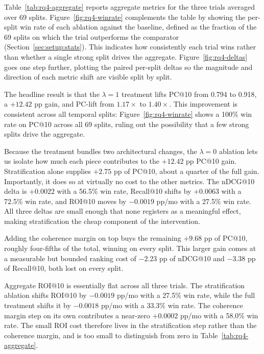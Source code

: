 Table~\ref{tab:rq4-aggregate} reports aggregate metrics for the three trials averaged over 69 splits. Figure~\ref{fig:rq4-winrate} complements the table by showing the per-split win rate of each ablation against the baseline, defined as the fraction of the 69 splits on which the trial outperforms the comparator (Section~\ref{sec:setup:stats}). This indicates how consistently each trial wins rather than whether a single strong split drives the aggregate. Figure~\ref{fig:rq4-deltas} goes one step further, plotting the paired per-split deltas so the magnitude and direction of each metric shift are visible split by split.

The headline result is that the $\lambda = 1$ treatment lifts PC@10 from 0.794 to 0.918, a $+12.42$ pp gain, and PC-lift from $1.17\times$ to $1.40\times$. This improvement is consistent across all temporal splits: Figure~\ref{fig:rq4-winrate} shows a 100\% win rate on PC@10 across all 69 splits, ruling out the possibility that a few strong splits drive the aggregate.

Because the treatment bundles two architectural changes, the $\lambda = 0$ ablation lets us isolate how much each piece contributes to the $+12.42$ pp PC@10 gain. Stratification alone supplies $+2.75$ pp of PC@10, about a quarter of the full gain. Importantly, it does so at virtually no cost to the other metrics. The nDCG@10 delta is $+0.0022$ with a 56.5\% win rate, Recall@10 shifts by $+0.0063$ with a 72.5\% win rate, and ROI@10 moves by $-0.0019$ pp/mo with a 27.5\% win rate. All three deltas are small enough that none registers as a meaningful effect, making stratification the cheap component of the intervention.

Adding the coherence margin on top buys the remaining $+9.68$ pp of PC@10, roughly four-fifths of the total, winning on every split. This larger gain comes at a measurable but bounded ranking cost of $-2.23$ pp of nDCG@10 and $-3.38$ pp of Recall@10, both lost on every split.

Aggregate ROI@10 is essentially flat across all three trials. The stratification ablation shifts ROI@10 by $-0.0019$ pp/mo with a 27.5\% win rate, while the full treatment shifts it by $-0.0018$ pp/mo with a 33.3\% win rate. The coherence margin step on its own contributes a near-zero $+0.0002$ pp/mo with a 58.0\% win rate. The small ROI cost therefore lives in the stratification step rather than the coherence margin, and is too small to distinguish from zero in Table~\ref{tab:rq4-aggregate}.

